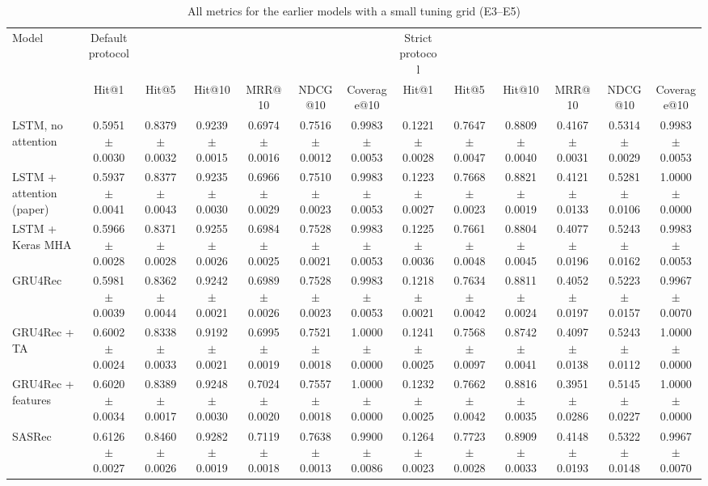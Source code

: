 \begin{table}[t]\centering\footnotesize
\caption{All metrics for the earlier models with a small tuning grid (E3–E5)}
\begin{tabular}{lcccccccccccc}\toprule
Model & Default protocol &  &  &  &  &  & Strict protocol &  &  &  &  &  \\
 & Hit@1 & Hit@5 & Hit@10 & MRR@10 & NDCG@10 & Coverage@10 & Hit@1 & Hit@5 & Hit@10 & MRR@10 & NDCG@10 & Coverage@10 \\
\midrule
LSTM, no attention & 0.5951 $\pm$ 0.0030 & 0.8379 $\pm$ 0.0032 & 0.9239 $\pm$ 0.0015 & 0.6974 $\pm$ 0.0016 & 0.7516 $\pm$ 0.0012 & 0.9983 $\pm$ 0.0053 & 0.1221 $\pm$ 0.0028 & 0.7647 $\pm$ 0.0047 & 0.8809 $\pm$ 0.0040 & 0.4167 $\pm$ 0.0031 & 0.5314 $\pm$ 0.0029 & 0.9983 $\pm$ 0.0053 \\
LSTM + attention (paper) & 0.5937 $\pm$ 0.0041 & 0.8377 $\pm$ 0.0043 & 0.9235 $\pm$ 0.0030 & 0.6966 $\pm$ 0.0029 & 0.7510 $\pm$ 0.0023 & 0.9983 $\pm$ 0.0053 & 0.1223 $\pm$ 0.0027 & 0.7668 $\pm$ 0.0023 & 0.8821 $\pm$ 0.0019 & 0.4121 $\pm$ 0.0133 & 0.5281 $\pm$ 0.0106 & 1.0000 $\pm$ 0.0000 \\
LSTM + Keras MHA & 0.5966 $\pm$ 0.0028 & 0.8371 $\pm$ 0.0028 & 0.9255 $\pm$ 0.0026 & 0.6984 $\pm$ 0.0025 & 0.7528 $\pm$ 0.0021 & 0.9983 $\pm$ 0.0053 & 0.1225 $\pm$ 0.0036 & 0.7661 $\pm$ 0.0048 & 0.8804 $\pm$ 0.0045 & 0.4077 $\pm$ 0.0196 & 0.5243 $\pm$ 0.0162 & 0.9983 $\pm$ 0.0053 \\
GRU4Rec & 0.5981 $\pm$ 0.0039 & 0.8362 $\pm$ 0.0044 & 0.9242 $\pm$ 0.0021 & 0.6989 $\pm$ 0.0026 & 0.7528 $\pm$ 0.0023 & 0.9983 $\pm$ 0.0053 & 0.1218 $\pm$ 0.0021 & 0.7634 $\pm$ 0.0042 & 0.8811 $\pm$ 0.0024 & 0.4052 $\pm$ 0.0197 & 0.5223 $\pm$ 0.0157 & 0.9967 $\pm$ 0.0070 \\
GRU4Rec + TA & 0.6002 $\pm$ 0.0024 & 0.8338 $\pm$ 0.0033 & 0.9192 $\pm$ 0.0021 & 0.6995 $\pm$ 0.0019 & 0.7521 $\pm$ 0.0018 & 1.0000 $\pm$ 0.0000 & 0.1241 $\pm$ 0.0025 & 0.7568 $\pm$ 0.0097 & 0.8742 $\pm$ 0.0041 & 0.4097 $\pm$ 0.0138 & 0.5243 $\pm$ 0.0112 & 1.0000 $\pm$ 0.0000 \\
GRU4Rec + features & 0.6020 $\pm$ 0.0034 & 0.8389 $\pm$ 0.0017 & 0.9248 $\pm$ 0.0030 & 0.7024 $\pm$ 0.0020 & 0.7557 $\pm$ 0.0018 & 1.0000 $\pm$ 0.0000 & 0.1232 $\pm$ 0.0025 & 0.7662 $\pm$ 0.0042 & 0.8816 $\pm$ 0.0035 & 0.3951 $\pm$ 0.0286 & 0.5145 $\pm$ 0.0227 & 1.0000 $\pm$ 0.0000 \\
SASRec & 0.6126 $\pm$ 0.0027 & 0.8460 $\pm$ 0.0026 & 0.9282 $\pm$ 0.0019 & 0.7119 $\pm$ 0.0018 & 0.7638 $\pm$ 0.0013 & 0.9900 $\pm$ 0.0086 & 0.1264 $\pm$ 0.0023 & 0.7723 $\pm$ 0.0028 & 0.8909 $\pm$ 0.0033 & 0.4148 $\pm$ 0.0193 & 0.5322 $\pm$ 0.0148 & 0.9967 $\pm$ 0.0070 \\

\end{tabular}
\end{table}
